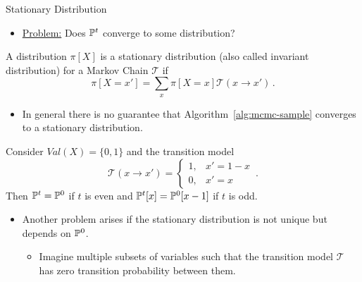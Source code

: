 \begin{frame}{Stationary Distribution}
\begin{itemize}
    \item \underline{Problem:} Does $\Pb^t$ converge to some distribution?
\end{itemize}
\pause
\begin{definition}
   A distribution $\pi[X]$ is a stationary distribution (also called invariant distribution) for a Markov Chain $\mathcal{T}$ if 
   \begin{equation}
    \pi[X = x'] = \sum_{x} \pi[X = x] \mathcal{T}(x \rightarrow x')\,.
   \end{equation}
\end{definition}
\begin{itemize}
    \pause \item In general there is no guarantee that Algorithm~\ref{alg:mcmc-sample} converges to a stationary distribution.
\end{itemize}
\pause
\begin{example}
    Consider $Val(X) = \{0,1\}$ and the transition model 
    \begin{equation}
      \mathcal{T}(x \rightarrow x') = \begin{cases} 1, & x' = 1-x \\ 0, & x' = x \end{cases}\,.
    \end{equation}
    Then $\Pb^t = \Pb^0$ if $t$ is even and $\Pb^t[x] = \Pb^0[x-1]$ if $t$ is odd.
\end{example}
\begin{itemize}
\pause \item Another problem arises if the stationary distribution is not unique but depends on $\Pb^0$.
\begin{itemize}
    \pause \item Imagine multiple subsets of variables such that the transition model $\mathcal{T}$ has zero transition probability between them.
\end{itemize}
\end{itemize}
\end{frame}

